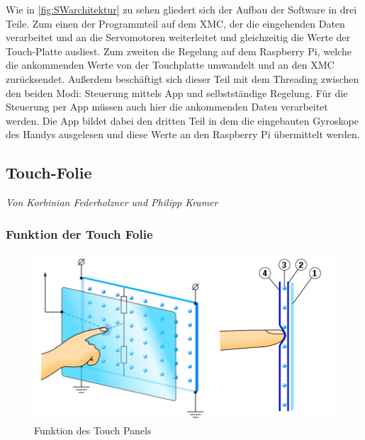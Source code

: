 \documentclass[12pt,a4paper,bibliography=totoc,listof=totoc]{scrartcl}
\begin{document}
Wie in \ref{fig:SWarchitektur} zu sehen gliedert sich der Aufbau der Software in drei Teile. Zum einen der 
Programmteil auf dem XMC, der die eingehenden Daten verarbeitet und an die Servomotoren weiterleitet und 
gleichzeitig die Werte der Touch-Platte ausliest. Zum zweiten die Regelung auf dem Raspberry Pi, welche 
die ankommenden Werte von der Touchplatte umwandelt und an den XMC zurücksendet. Außerdem beschäftigt sich 
dieser Teil mit dem Threading zwischen den beiden Modi: Steuerung mittels App und selbstständige Regelung. 
Für die Steuerung per App müssen auch hier die ankommenden Daten verarbeitet werden. Die App bildet dabei 
den dritten Teil in dem die eingebauten Gyroskope des Handys ausgelesen und diese Werte an den Raspberry Pi 
übermittelt werden.
\subsection{Touch-Folie} \label{subsec:Touch-Folie}
\textit{Von Korbinian Federholzner und Philipp Kramer}\newline
\subsubsection{Funktion der Touch Folie}

\begin{figure}[htbp]
	\centering
	\includegraphics[scale = 0.6]{pics/TouchScreen_5wires.png}
	\caption{Funktion des Touch Panels} 
	\label{fig:TouchPanelFunction}
\end{figure}
\end{document}
